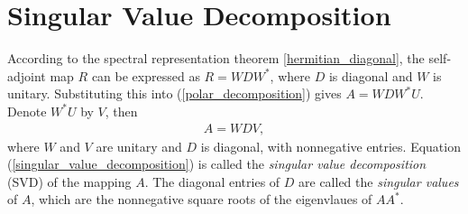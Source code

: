 \documentclass[10pt]{book}
\theoremstyle{definition}
\numberwithin{equation}{chapter}
\begin{document}
\section{Singular Value Decomposition}

According to the spectral representation theorem \ref{hermitian_diagonal}, the self-adjoint map $R$ can be expressed as $R = WDW^*$, where $D$ is diagonal and $W$ is unitary. Substituting this into (\ref{polar_decomposition}) gives $A = WDW^* U$. Denote $W^*U$ by $V$, then 
\begin{align}\label{singular_value_decomposition}
    A = WDV,
\end{align}
where $W$ and $V$ are unitary and $D$ is diagonal, with nonnegative entries. Equation (\ref{singular_value_decomposition}) is called the {\em singular value decomposition} (SVD) of the mapping $A$. The diagonal entries of $D$ are called the {\em singular values} of $A$, which are the nonnegative square roots of the eigenvlaues of $AA^*$. 

\medskip
\end{document}
